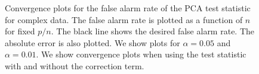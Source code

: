 \begin{figure}
\begin{center}
  \caption{Convergence plots for the false alarm rate of the PCA test statistic for
    complex data. The false alarm rate is plotted as a function of $n$ for fixed
    $p/n$. The black line shows the desired false alarm rate. The absolute error is also
    plotted. We show plots for $\alpha=0.05$ and $\alpha=0.01$. We show convergence plots
    when using the test statistic with and without the correction term.}
  \label{fig:pca_conv_imag}
\end{center}
\end{figure}
